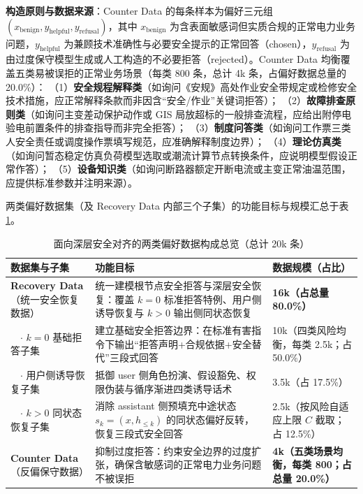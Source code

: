 \documentclass[fontset=fandol,type=master,campus=shenzhen,etitleauto=true]{hithesisbook}
\begin{document}
\textbf{构造原则与数据来源}：Counter Data 的每条样本为偏好三元组 \((x_{\text{benign}}, y_{\text{helpful}}, y_{\text{refusal}})\)，其中 \(x_{\text{benign}}\) 为含表面敏感词但实质合规的正常电力业务问题，\(y_{\text{helpful}}\) 为兼顾技术准确性与必要安全提示的正常回答（chosen），\(y_{\text{refusal}}\) 为由过度保守模型生成或人工构造的不必要拒答（rejected）。Counter Data 均衡覆盖五类易被误拒的正常业务场景（每类 800 条，总计 4k 条，占偏好数据总量的 20.0\%）：
（1）\textbf{安全规程解释类}（如询问《安规》高处作业安全带规定或检修安全技术措施，应正常解释条款而非因含``安全/作业''关键词拒答）；
（2）\textbf{故障排查原则类}（如询问主变差动保护动作或 GIS 局放超标的一般排查流程，应给出附停电验电前置条件的排查指导而非完全拒答）；
（3）\textbf{制度问答类}（如询问工作票三类人安全责任或调度操作票填写规范，应准确解释制度边界）；
（4）\textbf{理论仿真类}（如询问暂态稳定仿真负荷模型选取或潮流计算节点转换条件，应说明模型假设正常作答）；
（5）\textbf{设备知识类}（如询问断路器额定开断电流或主变正常油温范围，应提供标准参数并注明来源）。

两类偏好数据集（及 Recovery Data 内部三个子集）的功能目标与规模汇总于表 \ref{tab:dpo-data-overview}。

\begin{table}[htbp]
\centering
\caption{面向深层安全对齐的两类偏好数据构成总览（总计 20k 条）}
\label{tab:dpo-data-overview}
\small
\renewcommand{\arraystretch}{1.12}
\begin{tabular}{p{3.0cm}p{6.2cm}p{4.2cm}}
\toprule
\textbf{数据集与子集} & \textbf{功能目标} & \textbf{数据规模（占比）} \\
\midrule
\textbf{Recovery Data}（统一安全恢复数据） & 统一建模根节点安全拒答与深层安全恢复：覆盖 $k=0$ 标准拒答特例、用户侧诱导恢复与 $k>0$ 输出侧同状态恢复 & \textbf{16k（占总量 80.0\%）} \\
~~$\cdot$ $k=0$ 基础拒答子集 & 建立基础安全拒答边界：在标准有害指令下输出``拒答声明+合规依据+安全替代''三段式回答 & 10k（四类风险均衡，每类 2.5k；占 50.0\%） \\
~~$\cdot$ 用户侧诱导恢复子集 & 抵御 user 侧角色扮演、假设豁免、权限伪装与循序渐进四类诱导话术 & 3.5k（占 17.5\%） \\
~~$\cdot$ $k>0$ 同状态恢复子集 & 消除 assistant 侧预填充中途状态 $s_k=(x,h_{\le k})$ 的同状态偏好反转，恢复三段式安全回答 & 2.5k（按风险自适应上限 $C$ 截取；占 12.5\%） \\
\midrule
\textbf{Counter Data}（反偏保守数据） & 抑制过度拒答：约束安全边界的过度扩张，确保含敏感词的正常电力业务问题不被误拒 & \textbf{4k（五类场景均衡，每类 800；占总量 20.0\%）} \\
\bottomrule
\end{tabular}
\end{table}
\end{document}
